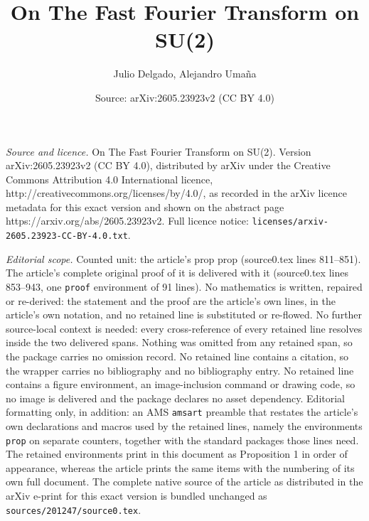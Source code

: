 \documentclass[10pt,a4paper]{amsart}
\title{On The Fast Fourier Transform on SU(2)}
\author{Julio Delgado, Alejandro Uma\~na}
\date{Source: arXiv:2605.23923v2 (CC BY 4.0)}
\begin{document}
\maketitle

\noindent\emph{Source and licence.} On The Fast Fourier Transform on SU(2). Version arXiv:2605.23923v2 (CC BY 4.0), distributed by arXiv under the Creative Commons Attribution 4.0 International licence, http://creativecommons.org/licenses/by/4.0/, as recorded in the arXiv licence metadata for this exact version and shown on the abstract page https://arxiv.org/abs/2605.23923v2. Full licence notice: \texttt{licenses/arxiv-2605.23923-CC-BY-4.0.txt}.\par\smallskip

\noindent\textit{Editorial scope.} Counted unit: the article's prop prop (source0.tex lines 811--851). The article's complete original proof of it is delivered with it (source0.tex lines 853--943, one \texttt{proof} environment of 91 lines). No mathematics is written, repaired or re-derived: the statement and the proof are the article's own lines, in the article's own notation, and no retained line is substituted or re-flowed.  No further source-local context is needed: every cross-reference of every retained line resolves inside the two delivered spans.  Nothing was omitted from any retained span, so the package carries no omission record.  No retained line contains a citation, so the wrapper carries no bibliography and no bibliography entry.  No retained line contains a figure environment, an image-inclusion command or drawing code, so no image is delivered and the package declares no asset dependency.  Editorial formatting only, in addition: an AMS \texttt{amsart} preamble that restates the article's own declarations and macros used by the retained lines, namely the environments \texttt{prop} on separate counters, together with the standard packages those lines need.  The retained environments print in this document as Proposition 1 in order of appearance, whereas the article prints the same items with the numbering of its own full document.  The complete native source of the article as distributed in the arXiv e-print for this exact version is bundled unchanged as \texttt{sources/201247/source0.tex}.
\end{document}
